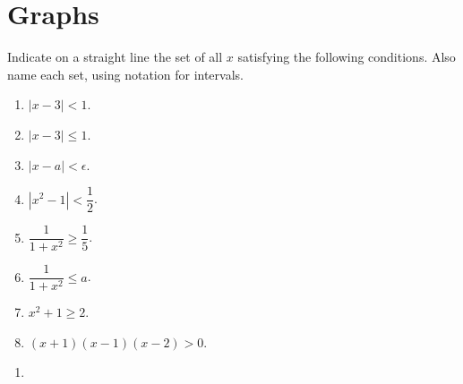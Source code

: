 \chapter{Graphs}
\begin{pr} \label{4.1}
  Indicate on a straight line the set of all $x$ satisfying the following
  conditions. Also name each set, using notation for intervals.
  \begin{enumerate}[label = (\roman*)]
    \item $|x - 3| < 1$.
    \item $|x - 3| \leq 1$.
    \item $|x - a| < \epsilon$.
    \item $|x^2 - 1| < \dfrac{1}{2}$.
    \item $\dfrac{1}{1 + x^2} \geq \dfrac{1}{5}$.
    \item $\dfrac{1}{1 + x^2} \leq a$.
    \item $x^2 + 1 \geq 2$.
    \item $(x + 1)(x - 1)(x - 2) > 0$.
  \end{enumerate}
\end{pr}

\begin{solution}
  \begin{enumerate}[label = (\roman*)]
    \item
  \end{enumerate}
\end{solution}
